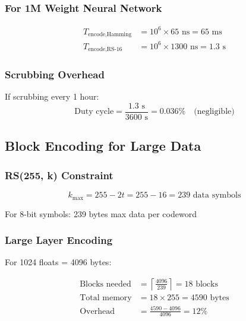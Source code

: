 \documentclass[11pt,a4paper]{article}
\begin{document}
\subsubsection{For 1M Weight Neural Network}

\begin{align}
T_{\text{encode,Hamming}} &= 10^6 \times 65 \text{ ns} = 65 \text{ ms} \\
T_{\text{encode,RS-16}} &= 10^6 \times 1300 \text{ ns} = 1.3 \text{ s}
\end{align}

\subsubsection{Scrubbing Overhead}

If scrubbing every 1 hour:
\begin{equation}
\text{Duty cycle} = \frac{1.3 \text{ s}}{3600 \text{ s}} = 0.036\% \quad \text{(negligible)}
\end{equation}

\subsection{Block Encoding for Large Data}

\subsubsection{RS(255, k) Constraint}

\begin{equation}
k_{\max} = 255 - 2t = 255 - 16 = 239 \text{ data symbols}
\end{equation}

For 8-bit symbols: 239 bytes max data per codeword

\subsubsection{Large Layer Encoding}

For 1024 floats = 4096 bytes:

\begin{align}
\text{Blocks needed} &= \left\lceil \frac{4096}{239} \right\rceil = 18 \text{ blocks} \\
\text{Total memory} &= 18 \times 255 = 4590 \text{ bytes} \\
\text{Overhead} &= \frac{4590 - 4096}{4096} = 12\%
\end{align}
\end{document}
